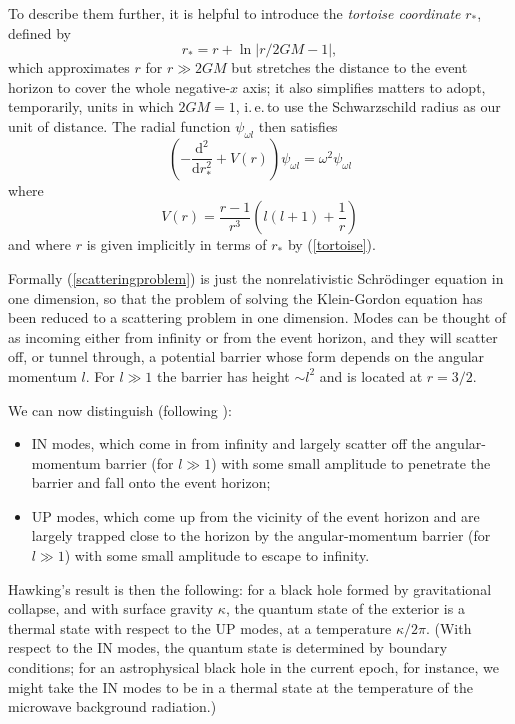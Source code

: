 \documentclass[12pt]{article}
\newcommand{\iec}{\mbox{i.\,e.\,}}
\newcommand{\be}{\begin{equation}}
\newcommand{\ee}{\end{equation}}
\begin{document}
To describe them further, it is helpful to introduce the \emph{tortoise coordinate} $r_*$, defined by
\be\label{tortoise}
r_* = r+ \ln |r/2GM - 1|,
\ee
which approximates $r$ for $r\gg 2GM$ but stretches the distance to the event horizon to cover the whole negative-$x$ axis; it also simplifies matters to adopt, temporarily, units in which $2GM=1$, \iec to use the Schwarzschild radius as our unit of distance. The radial function $\psi_{\omega l}$ then satisfies
\be\label{scatteringproblem}
\left( -\frac{\mathrm{d}^2}{\mathrm{d}r_*^2}+V(r)\right) \psi_{\omega l}  = \omega^2 \psi_{\omega l}  
\ee
where
\be\label{barrier}
V(r)=\frac{r-1}{r^3}\left(l(l+1) + \frac{1}{r}\right)
\ee
and where $r$ is given implicitly in terms of $r_*$ by (\ref{tortoise}). 

Formally (\ref{scatteringproblem}) is just the nonrelativistic Schr\"{o}dinger equation in one dimension, so that the problem of solving the Klein-Gordon equation has been reduced to a scattering problem in one dimension.  Modes can be thought of as incoming either from infinity or from the event horizon, and they will scatter off, or tunnel through, a potential barrier whose form depends on the angular momentum $l$. For $l\gg 1$ the barrier has height $\sim l^2$ and is located at $r=3/2$.  

We can now distinguish (following \cite[ch.VIII]{membraneparadigm}):
\begin{itemize}
\item IN modes, which come in from infinity and largely scatter off the angular-momentum barrier (for $l\gg 1$) with some small amplitude to penetrate the barrier and fall onto the event horizon;
\item UP modes, which come up from the vicinity of the event horizon and are largely trapped close to the horizon by the angular-momentum barrier (for $l\gg 1$) with some small amplitude to escape to infinity.
\end{itemize}
 
 Hawking's result is then the following: for a black hole formed by gravitational collapse, and with surface gravity $\kappa$, the quantum state of the exterior is a thermal state with respect to the UP modes, at a temperature $\kappa/2\pi$. (With respect to the IN modes, the quantum state is determined by boundary conditions; for an astrophysical black hole in the current epoch, for instance, we might take the IN modes to be in a thermal state at the temperature of the microwave background radiation.)
 
\end{document}
